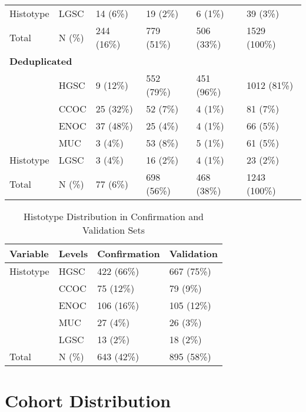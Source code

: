 \documentclass[
]{report}
\begin{document}
\begin{table}
\begin{tabular}[t]{l|l|l|l|l|l}
\cline{2-6}
\multirow{-5}{*}{\raggedright\arraybackslash \hspace{1em}Histotype} & LGSC & 14 (6\%) & 19 (2\%) & 6 (1\%) & 39 (3\%)\\
\cline{1-6}
\hspace{1em}Total & N (\%) & 244 (16\%) & 779 (51\%) & 506 (33\%) & 1529 (100\%)\\
\cline{1-6}
\multicolumn{6}{l}{\textbf{Deduplicated}}\\
\hline
 & HGSC & 9 (12\%) & 552 (79\%) & 451 (96\%) & 1012 (81\%)\\
\cline{2-6}
 & CCOC & 25 (32\%) & 52 (7\%) & 4 (1\%) & 81 (7\%)\\
\cline{2-6}
 & ENOC & 37 (48\%) & 25 (4\%) & 4 (1\%) & 66 (5\%)\\
\cline{2-6}
 & MUC & 3 (4\%) & 53 (8\%) & 5 (1\%) & 61 (5\%)\\
\cline{2-6}
\multirow{-5}{*}{\raggedright\arraybackslash \hspace{1em}Histotype} & LGSC & 3 (4\%) & 16 (2\%) & 4 (1\%) & 23 (2\%)\\
\cline{1-6}
\hspace{1em}Total & N (\%) & 77 (6\%) & 698 (56\%) & 468 (38\%) & 1243 (100\%)\\
\hline
\end{tabular}
\end{table}

\begin{table}

\caption{\label{tab:hist-conf-val}Histotype Distribution in Confirmation and Validation Sets}
\centering
\begin{tabular}[t]{l|l|l|l}
\hline
Variable & Levels & Confirmation & Validation\\
\hline
Histotype & HGSC & 422 (66\%) & 667 (75\%)\\
\hline
 & CCOC & 75 (12\%) & 79 (9\%)\\
\hline
 & ENOC & 106 (16\%) & 105 (12\%)\\
\hline
 & MUC & 27 (4\%) & 26 (3\%)\\
\hline
 & LGSC & 13 (2\%) & 18 (2\%)\\
\hline
Total & N (\%) & 643 (42\%) & 895 (58\%)\\
\hline
\end{tabular}
\end{table}

\section{Cohort Distribution}\label{cohort-distribution}
\end{document}
